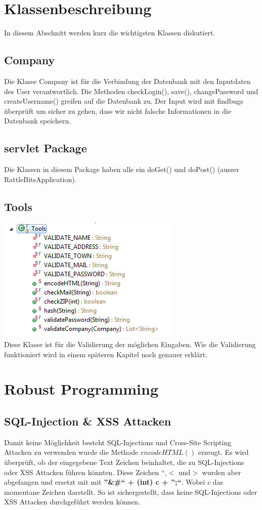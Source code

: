 \documentclass[10pt]{article}
\newcommand{\Bold}[1]{\textbf{#1}} %
\begin{document}
\section{Klassenbeschreibung}
In diesem Abschnitt werden kurz die wichtigsten Klassen diskutiert.
\subsection{Company}
Die Klasse Company ist f\"{u}r die Verbindung der Datenbank mit den Inputdaten des User verantwortlich. Die Methoden checkLogin(), save(), changePassword und createUsername() greifen auf die Datenbank zu. Der Input wird mit findbugs \"{u}berpr\"{u}ft um sicher zu gehen, dass wir nicht falsche Informationen in die Datenbank speichern.
\subsection{servlet Package}
Die Klassen in diesem Package haben alle ein doGet() und doPost() (ausser RattleBitsApplication).
\subsection{Tools}
\includegraphics[scale=1]{tools.png}\\
Diese Klasse ist f\"{u}r die Validierung der m\"{o}glichen Eingaben. Wie die Validierung funktioniert wird in einem späteren Kapitel noch genauer erklärt.
\section{Robust Programming}
\subsection{SQL-Injection \& XSS Attacken}
Damit keine Möglichkeit besteht SQL-Injections und Cross-Site Scripting Attacken zu verwenden wurde die Methode $encodeHTML()$ erzeugt. Es wird überprüft, ob der eingegebene Text Zeichen beinhaltet, die zu SQL-Injections oder XSS Attacken führen könnten. Diese Zeichen ``,$<$ und$>$ wurden aber abgefangen und ersetzt mit mit \Bold{''\&\#`` + (int) c + '';``}. Wobei $c$ das momentane Zeichen darstellt. So ist sichergestellt, dass keine SQL-Injections oder XSS Attacken durchgeführt werden können.

\end{document}
